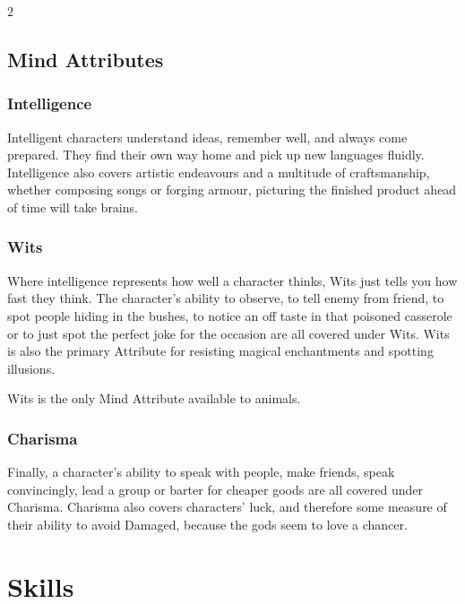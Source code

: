 \begin{multicols}{2}
\smallskip

\subsection{Mind Attributes}

\subsubsection[Intelligence]{Intelligence }

Intelligent characters understand ideas, remember well, and always come prepared.
They find their own way home and pick up new languages fluidly.
Intelligence also covers artistic endeavours and a multitude of craftsmanship, whether composing songs or forging armour, picturing the finished product ahead of time will take brains.

\subsubsection[Wits]{Wits }

Where intelligence represents how well a character thinks, Wits just tells you how fast they think.
The character's ability to observe, to tell enemy from friend, to spot people hiding in the bushes, to notice an off taste in that poisoned casserole or to just spot the perfect joke for the occasion are all covered under Wits.
Wits is also the primary Attribute for resisting magical enchantments and spotting illusions.

Wits is the only Mind Attribute available to animals.

\subsubsection[Charisma]{Charisma }

Finally, a character's ability to speak with people, make friends, speak convincingly, lead a group or barter for cheaper goods are all covered under Charisma.
Charisma also covers characters' luck, and therefore some measure of their ability to avoid Damaged, because the gods seem to love a chancer.

\end{multicols}

\section{Skills}

